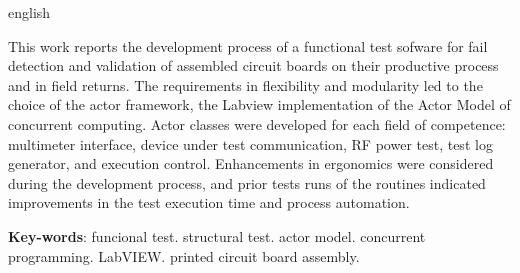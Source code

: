\begin{resumo}[Abstract]
 \begin{otherlanguage*}{english}
   
   This work reports the development process of a functional test sofware for fail detection and validation of assembled circuit boards on their productive process and in field returns. The requirements in flexibility and modularity led to the choice of the actor framework, the Labview implementation of the Actor Model of concurrent computing. Actor classes were developed for each field of competence: multimeter interface, device under test communication, RF power test, test log generator, and execution control. Enhancements in ergonomics were considered during the development process, and prior tests runs of the routines indicated improvements in the test execution time and process automation.
   
   \vspace{\onelineskip}
 
   \noindent 
   \textbf{Key-words}: funcional test. structural test. actor model. concurrent programming. LabVIEW. printed circuit board assembly.
 \end{otherlanguage*}
\end{resumo}

\listoffigures*
\cleardoublepage

\listoftables*
\cleardoublepage

